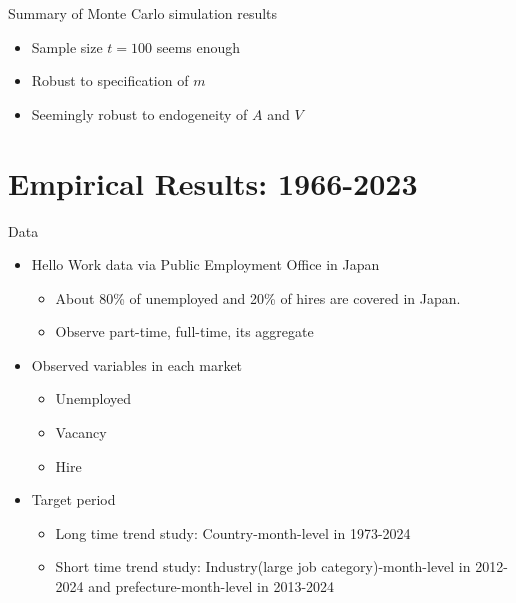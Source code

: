 \documentclass[aspectratio=169]{beamer}
\begin{document}
\begin{frame}{Summary of Monte Carlo simulation results}
\begin{itemize}
    \item Sample size $t=100$ seems enough
    \item Robust to specification of $m$
    \item Seemingly robust to endogeneity of $A$ and $V$
\end{itemize}
    
\end{frame}






\section{Empirical Results: 1966-2023}

\begin{frame}{Data}
  \begin{itemize}
      \item Hello Work data via Public Employment Office in Japan
      \begin{itemize}
          \item About 80\% of unemployed and 20\% of hires are covered in Japan.
          \item Observe part-time, full-time, its aggregate
      \end{itemize}
      \item Observed variables in each market
      \begin{itemize}
          \item Unemployed
          \item Vacancy
          \item Hire
      \end{itemize}
      \item Target period
      \begin{itemize}
          \item Long time trend study: Country-month-level in 1973-2024
          \item Short time trend study: Industry(large job category)-month-level in 2012-2024 and prefecture-month-level in 2013-2024
      \end{itemize}
      
  \end{itemize}
\end{frame}
\end{document}
